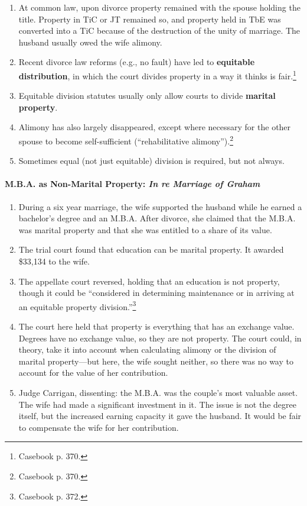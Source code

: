 \begin{enumerate}
    \item At common law, upon divorce property remained with the spouse 
    holding the title. Property in TiC or JT remained so, and property held in 
    TbE was converted into a TiC because of the destruction of the unity of 
    marriage. The husband usually owed the wife alimony.
    \item Recent divorce law reforms (e.g., no fault) have led to 
    \textbf{equitable distribution}, in which the court divides property in a 
    way it thinks is fair.\footnote{Casebook p. 370.}
    \item Equitable division statutes usually only allow courts to divide 
    \textbf{marital property}.
    \item Alimony has also largely disappeared, except where necessary for the 
    other spouse to become self-sufficient (``rehabilitative 
    alimony'').\footnote{Casebook p. 370.}
    \item Sometimes equal (not just equitable) division is required, but not 
    always.
\end{enumerate}

\paragraph{M.B.A. as Non-Marital Property: \emph{In re Marriage of Graham}}

\begin{enumerate}
    \item During a six year marriage, the wife supported the husband while he 
    earned a bachelor's degree and an M.B.A. After divorce, she claimed that 
    the M.B.A. was marital property and that she was entitled to a share of 
    its value.
    \item The trial court found that education can be marital property. It 
    awarded \$33,134 to the wife.
    \item The appellate court reversed, holding that an education is not 
    property, though it could be ``considered in determining maintenance or in 
    arriving at an equitable property division.''\footnote{Casebook p. 372.}
    \item The court here held that property is everything that has an exchange 
    value. Degrees have no exchange value, so they are not property. The court 
    could, in theory, take it into account when calculating alimony or the 
    division of marital property---but here, the wife sought neither, so there 
    was no way to account for the value of her contribution.
    \item Judge Carrigan, dissenting: the M.B.A. was the couple's most 
    valuable asset. The wife had made a significant investment in it. The 
    issue is not the degree itself, but the increased earning capacity it gave 
    the husband. It would be fair to compensate the wife for her contribution.
\end{enumerate}

